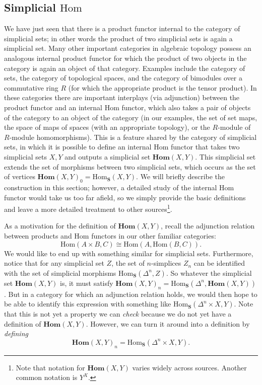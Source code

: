 \documentclass[12pt]{article}
\theoremstyle{plain}
\theoremstyle{definition}
\newcommand{\mbf}[1]{\mathbf{#1}}
\newcommand{\Hom}{\text{Hom}}
\newcommand{\Homs}{\textbf{Hom}}
\begin{document}
\subsection{Simplicial $\Hom$}\label{S: Hom}

We have just seen that there is a product functor internal to the category of simplicial sets; in other words the product of two simplicial sets is again a simplicial set. Many other important categories in algebraic topology possess an analogous internal product functor for which the product of two objects in the category is again an object of that category. Examples include the category of sets, the category of topological spaces, and the category of bimodules over a commutative ring $R$ (for which the appropriate product is the tensor product). In these categories there are important interplays (via adjunction) between the product functor and an internal $\Hom$ functor, which also takes a pair of objects of the category to an object of the category (in our examples, the set of set maps, the space of maps of spaces (with an appropriate topology), or the $R$-module of $R$-module homomorphisms). This is a feature shared by the category of simplicial sets, in which it is possible to define an internal $\Hom$ functor that takes two simplicial sets $X,Y$ and outputs a simplicial set $\Homs(X,Y)$. This simplicial set extends the set of morphisms between two simplicial sets, which occurs as the set of vertices $\Homs(X,Y)_0=\Hom_{\mbf S}(X,Y)$. We will briefly describe the construction in this section; however, a detailed study of the internal $\Hom$ functor would take us too far afield, so we simply provide the basic definitions  and leave a more detailed treatment to other sources\footnote{Note that notation for $\Homs(X,Y)$ varies widely across sources. Another common notation is $Y^X$. }. 

As a motivation for the definition of $\Homs(X,Y)$, recall the adjunction relation between products and $\Hom$ functors in our other familiar categories: $$\Hom(A\times B,C)\cong \Hom(A,\Hom(B,C)).$$ We would like to end up with something similar for simplicial sets. Furthermore, notice that for any simplicial set $Z$, the set of $n$-simplices $Z_n$ can be identified with the set of simplicial morphisms $\Hom_{\mbf S}(\Delta^n, Z)$. So whatever the simplicial set $\Homs(X,Y)$ is, it must satisfy $\Homs(X,Y)_n=\Hom_{\mbf S}(\Delta^n, \Homs(X,Y))$. But in a category for which an adjunction relation holds, we would then hope to be able to identify this expression with something like $\Hom_{\mbf S}(\Delta^n\times X,Y)$. Note that this is not yet a property we can \emph{check} because we do not yet have a definition of $\Homs(X,Y)$. However, we can turn it around into a definition by \emph{defining} $$\Homs(X,Y)_n= \Hom_{\mbf S}(\Delta^n\times X,Y).$$
\end{document}
